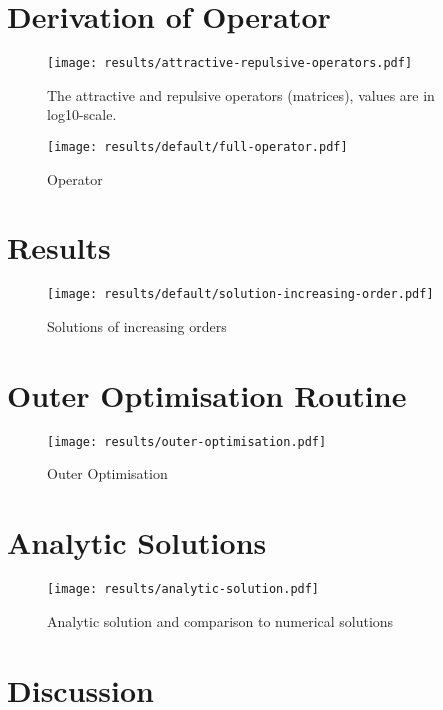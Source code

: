 \section{Derivation of Operator}


\begin{figure}[H]
  \centering
  \label{fig:attractive-repulsive}
  \texttt{[image: results/attractive-repulsive-operators.pdf]}
  \caption{The attractive and repulsive operators (matrices), values are in log10-scale.}
\end{figure}

\begin{figure}[H]
  \centering
  \label{fig:attrep-operator}
  \texttt{[image: results/default/full-operator.pdf]}
  \caption{Operator}
\end{figure}

\section{Results}
\begin{figure}[H]
  \centering
  \label{fig:solution-increasing-order}
  \texttt{[image: results/default/solution-increasing-order.pdf]}
  \caption{Solutions of increasing orders}
\end{figure}

\section{Outer Optimisation Routine}

\begin{figure}[H]
  \centering
  \label{fig:outer-optimisation}
  \texttt{[image: results/outer-optimisation.pdf]}
  \caption{Outer Optimisation}
\end{figure}

\section{Analytic Solutions}
\begin{figure}[H]
  \centering
  \label{fig:analytic-solution}
  \texttt{[image: results/analytic-solution.pdf]}
  \caption{Analytic solution and comparison to numerical solutions}
\end{figure}

\section{Discussion}


